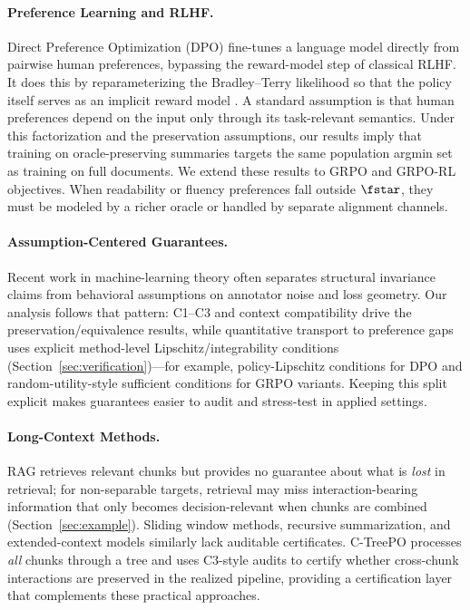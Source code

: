 \paragraph{Preference Learning and RLHF.}
Direct Preference Optimization (DPO) fine-tunes a language model directly from pairwise human preferences, bypassing the reward-model step of classical RLHF. It does this by reparameterizing the Bradley--Terry likelihood so that the policy itself serves as an implicit reward model \citep{BradleyTerry1952,RafailovEtAl2023DPO}. A standard assumption is that human preferences depend on the input only through its task-relevant semantics. Under this factorization and the preservation assumptions, our results imply that training on oracle-preserving summaries targets the same population argmin set as training on full documents. We extend these results to GRPO and GRPO-RL objectives. When readability or fluency preferences fall outside $\fstar$, they must be modeled by a richer oracle or handled by separate alignment channels.

\paragraph{Assumption-Centered Guarantees.}
Recent work in machine-learning theory often separates structural invariance claims from behavioral assumptions on annotator noise and loss geometry. Our analysis follows that pattern: C1--C3 and context compatibility drive the preservation/equivalence results, while quantitative transport to preference gaps uses explicit method-level Lipschitz/integrability conditions (Section~\ref{sec:verification})---for example, policy-Lipschitz conditions for DPO and random-utility-style sufficient conditions for GRPO variants. Keeping this split explicit makes guarantees easier to audit and stress-test in applied settings.

\paragraph{Long-Context Methods.}
RAG retrieves relevant chunks but provides no guarantee about what is \emph{lost} in retrieval; for non-separable targets, retrieval may miss interaction-bearing information that only becomes decision-relevant when chunks are combined (Section~\ref{sec:example}). Sliding window methods, recursive summarization, and extended-context models similarly lack auditable certificates. C-TreePO processes \emph{all} chunks through a tree and uses C3-style audits to certify whether cross-chunk interactions are preserved in the realized pipeline, providing a certification layer that complements these practical approaches.

